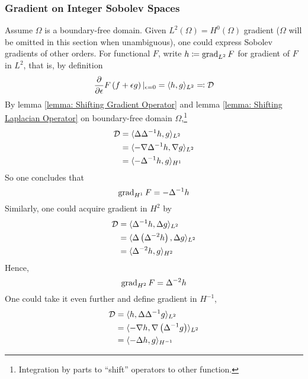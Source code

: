 \documentclass[../dissertation.tex]{subfiles}
\begin{document}
\subsubsection{Gradient on Integer Sobolev Spaces}
\label{sct: Gradient on Integer Sobolev Spaces}
Assume $\Omega$ is a boundary-free domain.
Given $L^2(\Omega) = H^0(\Omega)$ gradient ($\Omega$ will be omitted in this section when unambiguous), one could express Sobolev gradients of other orders.
For functional $F$, write $h \coloneqq \operatorname{grad}_{L^2} F$ for gradient of $F$ in $L^2$, that is, by definition
\begin{equation}
    \frac{\partial}{\partial \epsilon} F \left( f + \epsilon g \right)|_{\epsilon = 0} = \langle h, g \rangle_{L^2} \eqqcolon \mathcal{D}
    \label{equ: L2 Gradient Explicit Form}
\end{equation}
By lemma \ref{lemma: Shifting Gradient Operator} and lemma \ref{lemma: Shifting Laplacian Operator} on boundary-free domain $\Omega$,\footnote{Integration by parts to ``shift'' operators to other function.}
\begin{align*}
    \mathcal{D} &= \langle \Delta \Delta^{-1} h, g \rangle_{L^2} \\
    &= \langle -\nabla \Delta^{-1} h, \nabla g \rangle_{L^2} \\
    &= \langle -\Delta^{-1} h, g \rangle_{H^1}
\end{align*}
So one concludes that
\begin{equation}
    \operatorname{grad}_{H^1} F = -\Delta^{-1} h
    \label{equ: H1 Gradient}
\end{equation}
Similarly, one could acquire gradient in $H^2$ by
\begin{align*}
    \mathcal{D} &= \langle \Delta^{-1} h, \Delta g \rangle_{L^2} \\
    &= \langle \Delta \left( \Delta^{-2} h \right), \Delta g \rangle_{L^2} \\
    &= \langle \Delta^{-2} h, g \rangle_{H^2}
\end{align*}
Hence,
\begin{equation}
    \operatorname{grad}_{H^2} F = \Delta^{-2} h
    \label{equ: H2 Gradient}
\end{equation}
One could take it even further and define gradient in $H^{-1}$,
\begin{align*}
    \mathcal{D} &= \langle h, \Delta \Delta^{-1} g \rangle_{L^2} \\
    &= \langle -\nabla h, \nabla \left( \Delta^{-1} g \right) \rangle_{L^2} \\
    &= \langle -\Delta h, g \rangle_{H^{-1}}
\end{align*}
\end{document}
